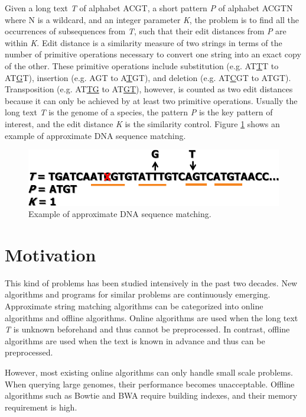 Given a long text \textit{T} of alphabet ACGT, a short pattern \textit{P} of alphabet ACGTN where N is a wildcard, and an integer parameter \textit{K}, the problem is to find all the occurrences of subsequences from \textit{T}, such that their edit distances from \textit{P} are within \textit{K}. Edit distance is a similarity measure of two strings in terms of the number of primitive operations necessary to convert one string into an exact copy of the other. These primitive operations include substitution (e.g. AT\underline{T}T to AT\underline{G}T), insertion (e.g. AGT to A\underline{T}GT), and deletion (e.g. AT\underline{C}GT to ATGT). Transposition (e.g. AT\underline{TG} to AT\underline{GT}), however, is counted as two edit distances because it can only be achieved by at least two primitive operations. Usually the long text \textit{T} is the genome of a species, the pattern \textit{P} is the key pattern of interest, and the edit distance \textit{K} is the similarity control. Figure \ref{fig:ApproximateMatchingExample} shows an example of approximate DNA sequence matching.

\begin{figure}
\centering
\includegraphics[width=\textwidth]{SequenceMatching/Figures/ApproximateMatchingExample.png}
\caption{Example of approximate DNA sequence matching.}
\label{fig:ApproximateMatchingExample}
\end{figure}

\section{Motivation}

This kind of problems has been studied intensively in the past two decades. New algorithms and programs for similar problems are continuously emerging. Approximate string matching algorithms can be categorized into online algorithms and offline algorithms. Online algorithms are used when the long text \textit{T} is unknown beforehand and thus cannot be preprocessed. In contrast, offline algorithms are used when the text is known in advance and thus can be preprocessed.

However, most existing online algorithms can only handle small scale problems. When querying large genomes, their performance becomes unacceptable. Offline algorithms such as Bowtie \citep{450-2009} and BWA \citep{251-2009} require building indexes, and their memory requirement is high.

